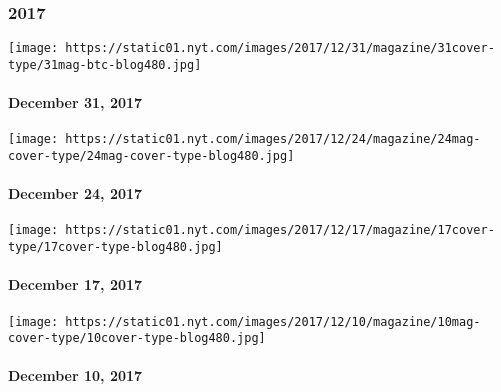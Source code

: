 \hypertarget{2017}{%
\subsubsection{2017}\label{2017}}

\href{https://www.nytimes.com/interactive/2017/12/28/magazine/the-lives-they-lived-2017.html}{}

\texttt{[image: https://static01.nyt.com/images/2017/12/31/magazine/31cover-type/31mag-btc-blog480.jpg]}

\hypertarget{december-31-2017}{%
\paragraph{December 31, 2017}\label{december-31-2017}}

\href{https://www.nytimes.com/issue/magazine/2017/12/26/122417-issue}{}

\texttt{[image: https://static01.nyt.com/images/2017/12/24/magazine/24mag-cover-type/24mag-cover-type-blog480.jpg]}

\hypertarget{december-24-2017}{%
\paragraph{December 24, 2017}\label{december-24-2017}}

\href{https://www.nytimes.com/interactive/2017/12/13/magazine/the-reckoning-women-and-power-in-the-workplace.html}{}

\texttt{[image: https://static01.nyt.com/images/2017/12/17/magazine/17cover-type/17cover-type-blog480.jpg]}

\hypertarget{december-17-2017}{%
\paragraph{December 17, 2017}\label{december-17-2017}}

\href{https://www.nytimes.com/interactive/2017/12/07/magazine/great-performers-horror-show.html}{}

\texttt{[image: https://static01.nyt.com/images/2017/12/10/magazine/10mag-cover-type/10cover-type-blog480.jpg]}

\hypertarget{december-10-2017}{%
\paragraph{December 10, 2017}\label{december-10-2017}}

\href{https://www.nytimes.com/issue/magazine/2017/12/01/120317-issue}{}

